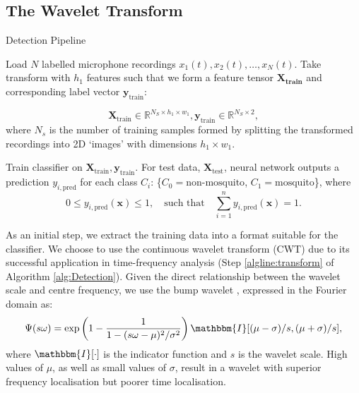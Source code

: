 \documentclass[10pt, twocolumn]{llncs}
\newcommand{\srN}[1]{\todo[inline, size=\small, color=cyan!30]{[sr] #1}}
\begin{document}
\subsection{The Wavelet Transform}
\label{subsec:wavSTFT}
%
%
\begin{algorithm}[]
	
	\caption{Detection Pipeline}
	\label{alg:Detection}
	\begin{algorithmic}[1]
	\State Load $N$ labelled microphone recordings $x_1(t), x_2(t), \ldots, x_N(t)$.
    \State Take{} transform with $h_1$ features such that we form a feature tensor $\mathbf{X_\text{train}}$ and corresponding label vector $\mathbf{y}_\text{train}$:
       
    $$\mathbf{X}_\textrm{train} \in \mathbb{R}^{N_S
 			\times h_1 \times w_1}, \mathbf{y}_\textrm{train} \in \mathbb{R}^{N_S \times 2},$$
    where $N_s$ is the number of training samples formed by splitting the transformed recordings into 2D `images' with dimensions $h_1 \times w_1$. 
    \label{algline:transform}


	\label{line:method:stft}
  	\State Train classifier on $\mathbf{X}_\textrm{train}, \mathbf{y}_\textrm{train}$.
	\State For test data, $\mathbf{X}_\textrm{test}$, neural network outputs a prediction $y_{i,\textrm{pred}}$ for each class $C_i$: \{$C_0 = \textrm{non-mosquito}$, $C_1 = \textrm{mosquito}$\}, where
			 $$ 0 \leq y_{i,\textrm{pred}}(\mathbf{x}) \leq 1, \quad \textrm{such that} \quad \sum_{i=1}^{n} y_{i,\textrm{pred}}(\mathbf{x}) = 1. $$
	\end{algorithmic}
\end{algorithm}

As an initial step, we extract the training data into a format suitable for the classifier. We choose to use the continuous wavelet transform (CWT) due to its successful application in time-frequency analysis \cite{daubechies2011synchrosqueezed} (Step \ref{algline:transform} of Algorithm \ref{alg:Detection}). Given the direct relationship between the wavelet scale and centre frequency, we use the bump wavelet \cite{vialatte2009bump}, expressed in the Fourier domain as:
\begin{equation} 
\Psi(s\omega) = \exp \left(1 - \frac{1}{1 - (s\omega - \mu)^2/\sigma^2}\right) 
   \mathbbm{I}[(\mu - \sigma)/s, (\mu + \sigma)/s],
\label{eq:bump}   
\end{equation}
where $\mathbbm{I}[\cdot]$ is the indicator function and $s$ is the wavelet scale. High values of $\mu$, as well as small values of $\sigma$, result in a wavelet with superior frequency localisation but poorer time localisation. 
\end{document}
